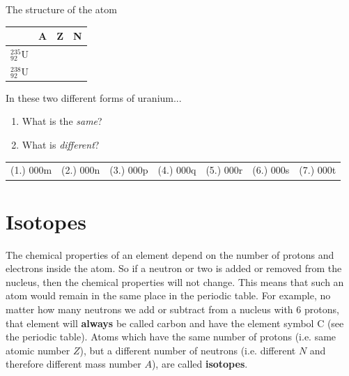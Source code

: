 \begin{exercises}{The structure of the atom}
\begin{enumerate}[noitemsep, label=\textbf{\arabic*}. ]
\begin{table}[H]
\begin{center}
    \noindent
      \begin{tabular}{|l|l|l|l|}\hline
         &
        \textbf{A} &
        \textbf{Z} &
        \textbf{N} \\ \hline
        $_{92}^{235}\text{U}$ &
         &
         &
        \\ \hline
        $_{92}^{238}\text{U}$ &
         &
         &
     \\ \hline
    \end{tabular}
      \end{center}
\end{table}
    \par
In these two different forms of uranium...
\label{m38745*id257277}\begin{enumerate}[noitemsep, label=\textbf{\alph*}. ] 
            \label{m38745*uid38}\item What is the \textsl{same}?
\label{m38745*uid39}\item What is \textsl{different}?
\end{enumerate}
\end{enumerate}
  \label{m38745**end}
\practiceinfo
\par 
 \par \begin{tabular}[h]{ccccccc}
 (1.) 000m  &  (2.) 000n  &  (3.) 000p  &  (4.) 000q  &  (5.) 000r  &  (6.) 000s  &  (7.) 000t  & \end{tabular}
\end{exercises}
         \section{Isotopes}
    \nopagebreak
The chemical properties of an element depend on the number of protons and electrons inside the atom. So if a neutron or two is added or removed from the nucleus, then the chemical properties will not change. This means that such an atom would remain in the same place in the periodic table. For example, no matter how many neutrons we add or subtract from a nucleus with 6 protons, that element will \textbf{always} be called carbon and have the element symbol $\text{C}$ (see the periodic table). Atoms which have the same number of protons (i.e.\@{} same atomic number $Z$), but a different number of neutrons (i.e.\@{} different $N$ and therefore different mass number $A$), are called \textbf{isotopes}. 

